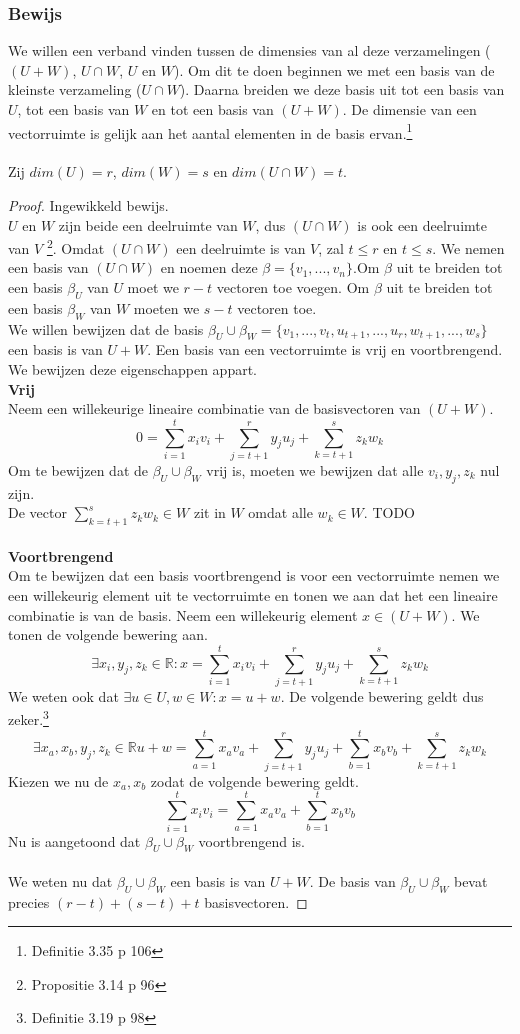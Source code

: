 \documentclass[lineaire_algebra_oplossingen.tex]{subfiles}
\begin{document}
\subsubsection*{Bewijs}
We willen een verband vinden tussen de dimensies van al deze verzamelingen ($(U+W)$, $U\cap W$, $U$ en $W$). Om dit te doen beginnen we met een basis van de kleinste verzameling ($U \cap W$). Daarna breiden we deze basis uit tot een basis van $U$, tot een basis van $W$ en tot een basis van $(U + W)$. De dimensie van een vectorruimte is gelijk aan het aantal elementen in de basis ervan.\footnote{Definitie 3.35 p 106}\\\\
Zij $dim(U) = r$, $dim(W)=s$ en $dim(U\cap W) = t$.
\begin{proof}
Ingewikkeld bewijs.\\
$U$ en $W$ zijn beide een deelruimte van $W$, dus $(U \cap W)$ is ook een deelruimte van $V$ \footnote{Propositie 3.14 p 96}. Omdat $(U \cap W)$ een deelruimte is van $V$, zal $t \le r$ en $t \le s$. We nemen een basis van $(U\cap W)$ en noemen deze $\beta = \{v_1,...,v_n\}$.Om $\beta$ uit te breiden tot een basis $\beta_U$ van $U$ moet we $r-t$ vectoren toe voegen. Om $\beta$ uit te breiden tot een basis $\beta_W$ van $W$ moeten we $s-t$ vectoren toe.\\
We willen bewijzen dat de basis $\beta_U \cup \beta_W = \{v_1,...,v_t,u_{t+1},...,u_{r},w_{t+1},...,w_{s}\}$ een basis is van $U+W$.
Een basis van een vectorruimte is vrij en voortbrengend. We bewijzen deze eigenschappen appart.\\
\textbf{Vrij}\\
Neem een willekeurige lineaire combinatie van de basisvectoren van $(U+W)$.
\[
0 = \sum_{i=1}^tx_iv_i + \sum_{j=t+1}^ry_ju_j + \sum_{k=t+1}^sz_kw_k
\]
Om te bewijzen dat de $\beta_U \cup \beta_W$ vrij is, moeten we bewijzen dat alle $v_i,y_j,z_k$ nul zijn.\\
De vector $\sum_{k=t+1}^sz_kw_k \in W$ zit in $W$ omdat alle $w_k \in W$.
TODO\\\\
\textbf{Voortbrengend}\\
Om te bewijzen dat een basis voortbrengend is voor een vectorruimte nemen we een willekeurig element uit te vectorruimte en tonen we aan dat het een lineaire combinatie is van de basis.
Neem een willekeurig element $x \in (U + W)$. We tonen de volgende bewering aan.
\[
\exists x_i,y_j,z_k \in \mathbb{R}: x = \sum_{i=1}^tx_iv_i + \sum_{j=t+1}^ry_ju_j + \sum_{k=t+1}^sz_kw_k
\]
We weten ook dat $\exists u\in U, w\in W: x = u+w$. De volgende bewering geldt dus zeker.\footnote{Definitie 3.19 p 98}
\[
\exists x_a,x_b,y_j,z_k \in \mathbb{R}  u+w = \sum_{a=1}^tx_av_a + \sum_{j=t+1}^ry_ju_j + \sum_{b=1}^tx_bv_b + \sum_{k=t+1}^sz_kw_k
\]
Kiezen we nu de $x_a,x_b$ zodat de volgende bewering geldt.
\[
\sum_{i=1}^tx_iv_i = \sum_{a=1}^tx_av_a + \sum_{b=1}^tx_bv_b 
\]
Nu is aangetoond dat $\beta_U \cup \beta_W$ voortbrengend is.
\\\\ 
We weten nu dat $\beta_U \cup \beta_W$ een basis is van $U+W$. De basis van $\beta_U \cup \beta_W$ bevat precies $(r-t)+(s-t)+t$ basisvectoren.

\end{proof}
\end{document}
